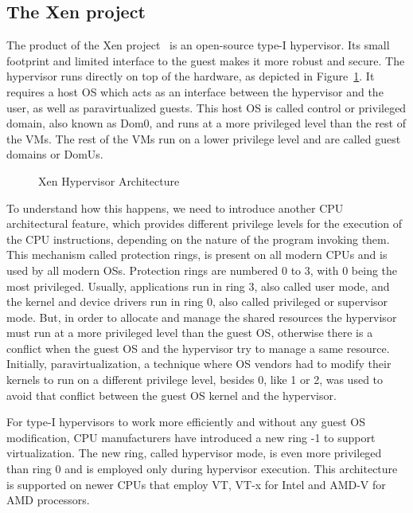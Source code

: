 \subsection{The Xen project}\label{sub:xen}
The product of the Xen project~\cite{xen} is an open-source type-I hypervisor. Its small footprint and limited interface to the guest makes it more robust and secure. The hypervisor runs directly on top of the hardware, as depicted in Figure~\ref{img:xen}. It requires a host \ac{OS} which acts as an interface between the hypervisor and the user, as well as paravirtualized guests. This host \ac{OS} is called control or privileged domain, also known as Dom0, and runs at a more privileged level than the rest of the \ac{VM}s. The rest of the \ac{VM}s run on a lower privilege level and are called guest domains or DomUs. 

\begin{figure}
	\centering
	
	\caption{Xen Hypervisor Architecture}
	\label{img:xen}
\end{figure}

\par To understand how this happens, we need to introduce another \ac{CPU} architectural feature, which provides different privilege levels for the execution of the \ac{CPU} instructions, depending on the nature of the program invoking them. This mechanism called protection rings, is present on all modern \ac{CPU}s and is used by all modern \acp{OS}. Protection rings are numbered 0 to 3, with 0 being the most privileged. Usually, applications run in ring 3, also called user mode, and the kernel and device drivers run in ring 0, also called privileged or supervisor mode. But, in order to allocate and manage the shared resources the hypervisor must run at a more privileged level than the guest \ac{OS}, otherwise there is a conflict when the guest \ac{OS} and the hypervisor try to manage a same resource. Initially, paravirtualization, a technique where \ac{OS} vendors had to modify their kernels to run on a different privilege level, besides 0, like 1 or 2, was used to avoid that conflict between the guest \ac{OS} kernel and the hypervisor.

\par For type-I hypervisors to work more efficiently and without any guest \ac{OS} modification, \ac{CPU} manufacturers have introduced a new ring -1 to support virtualization. The new ring, called hypervisor mode, is even more privileged than ring 0 and is employed only during hypervisor execution. This architecture is supported on newer \ac{CPU}s that employ \ac{VT}, VT-x for Intel and AMD-V for AMD processors. 

